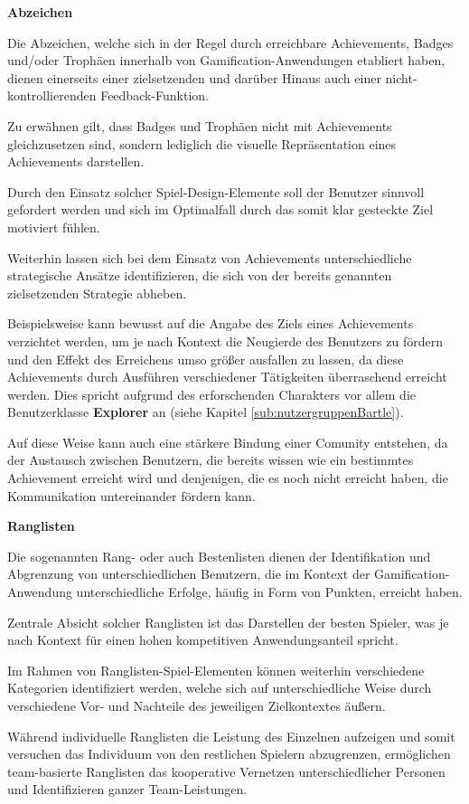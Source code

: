 \documentclass[bibliography=totoc,listof=totoc,BCOR=5mm,DIV=12,oneside]{scrbook}
\begin{document}
\newpage
\par \bigskip \textbf{Abzeichen}
\par Die Abzeichen, welche sich in der Regel durch erreichbare Achievements, Badges und/oder Trophäen innerhalb von Gamification-Anwendungen etabliert haben, dienen einerseits einer zielsetzenden und darüber Hinaus auch einer nicht-kontrollierenden Feedback-Funktion. 
\par Zu erwähnen gilt, dass Badges und Trophäen nicht mit Achievements gleichzusetzen sind, sondern lediglich die visuelle Repräsentation eines Achievements darstellen.
\par Durch den Einsatz solcher Spiel-Design-Elemente soll der Benutzer sinnvoll gefordert werden und sich im Optimalfall durch das somit klar gesteckte Ziel motiviert fühlen.
\par \medskip Weiterhin lassen sich bei dem Einsatz von Achievements unterschiedliche strategische Ansätze identifizieren, die sich von der bereits genannten zielsetzenden Strategie abheben. 
\par Beispielsweise kann bewusst auf die Angabe des Ziels eines Achievements verzichtet werden, um je nach Kontext die Neugierde des Benutzers zu fördern und den Effekt des Erreichens umso größer ausfallen zu lassen, da diese Achievements durch Ausführen verschiedener Tätigkeiten überraschend erreicht werden. Dies spricht aufgrund des erforschenden Charakters vor allem die Benutzerklasse \textbf{Explorer} an (siehe Kapitel \ref{sub:nutzergruppenBartle}). 
\par \bigskip Auf diese Weise kann auch eine stärkere Bindung einer Comunity entstehen, da der Austausch zwischen Benutzern, die bereits wissen wie ein bestimmtes Achievement erreicht wird und denjenigen, die es noch nicht erreicht haben, die Kommunikation untereinander fördern kann.

\par \bigskip \textbf{Ranglisten}
\par Die sogenannten Rang- oder auch Bestenlisten dienen der Identifikation und Abgrenzung von unterschiedlichen Benutzern, die im Kontext der Gamification-Anwendung unterschiedliche Erfolge, häufig in Form von Punkten, erreicht haben.
\par Zentrale Absicht solcher Ranglisten ist das Darstellen der besten Spieler, was je nach Kontext für einen hohen kompetitiven Anwendungsanteil spricht.

\par \medskip Im Rahmen von Ranglisten-Spiel-Elementen können weiterhin verschiedene Kategorien identifiziert werden, welche sich auf unterschiedliche Weise durch verschiedene Vor- und Nachteile des jeweiligen Zielkontextes äußern.
\par Während individuelle Ranglisten die Leistung des Einzelnen aufzeigen und somit versuchen das Individuum von den restlichen Spielern abzugrenzen, ermöglichen team-basierte Ranglisten das kooperative Vernetzen unterschiedlicher Personen und Identifizieren ganzer Team-Leistungen.
\end{document}
